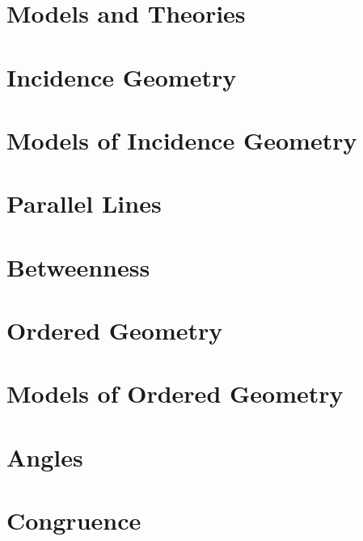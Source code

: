 \documentclass{memoir}
\begin{document}
\mainmatter
  \section{Models and Theories}
    
    \newpage

  \section{Incidence Geometry}
    
    \newpage

  \section{Models of Incidence Geometry}
    
    \newpage

  \section{Parallel Lines}
    
    \newpage

  \section{Betweenness}
    
    \newpage

  \section{Ordered Geometry}
    
    \newpage

  \section{Models of Ordered Geometry}
    
    \newpage

  \section{Angles}
    
    \newpage

  \section{Congruence}
    
    \newpage
\end{document}
